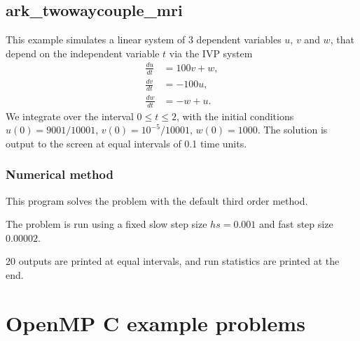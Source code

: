 \documentclass[letterpaper,10pt,english]{sphinxmanual}
\begin{document}
\section{ark\_twowaycouple\_mri}
\label{\detokenize{c_serial:id36}}\label{\detokenize{c_serial:ark-twowaycouple-mri}}
This example simulates a linear system of 3 dependent variables \(u\),
\(v\) and \(w\), that depend on the independent variable \(t\) via
the IVP system
\begin{equation*}
\begin{split}\frac{du}{dt} &= 100 v + w, \\
\frac{dv}{dt} &= -100 u, \\
\frac{dw}{dt} &= -w + u.\end{split}
\end{equation*}
We integrate over the interval \(0 \le t \le 2\), with the initial
conditions \(u(0) = 9001/10001\), \(v(0) = 10^{-5}/10001\),
\(w(0)= 1000\).  The solution is output to the screen at equal intervals of
0.1 time units.


\subsection{Numerical method}
\label{\detokenize{c_serial:id37}}
This program solves the problem with the default third order method.

The problem is run using a fixed slow step size \(hs=0.001\) and fast step
size \(0.00002\).

20 outputs are printed at equal intervals, and run statistics
are printed at the end.


\chapter{OpenMP C example problems}
\label{\detokenize{c_openmp:openmp-c-example-problems}}\label{\detokenize{c_openmp::doc}}\label{\detokenize{c_openmp:openmp-c}}
\end{document}
